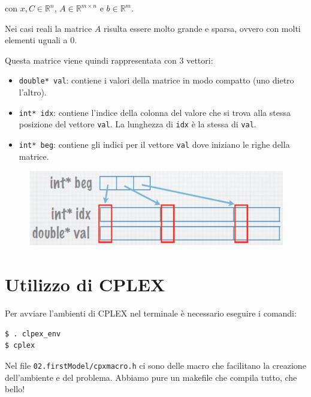 \noindent con $x,C \in \mathbb{R}^n$, $A \in \mathbb{R}^{m \times n}$ e $b \in \mathbb{R}^m$.

Nei casi reali la matrice $A$ risulta essere molto grande e sparsa, ovvero con molti elementi uguali a 0.

Questa matrice viene quindi rappresentata con 3 vettori:

\begin{itemize}
	\item \texttt{double* val}: contiene i valori della matrice in modo compatto (uno dietro l'altro).
	\item \texttt{int* idx}: contiene l'indice della colonna del valore che si trova alla stessa posizione del vettore \texttt{val}. La lunghezza di \texttt{idx} è la stessa di \texttt{val}.
	\item \texttt{int* beg}: contiene gli indici per il vettore \texttt{val} dove iniziano le righe della matrice.
\end{itemize}

\begin{figure}[htbp]
	\centering
	\includegraphics[width=0.5\linewidth]{./images/lab1-matrix}
\end{figure}

\section{Utilizzo di CPLEX}

Per avviare l'ambienti di CPLEX nel terminale è necessario eseguire i comandi:

\begin{verbatim}
$ . clpex_env
$ cplex
\end{verbatim}

\noindent Nel file \texttt{02.firstModel/cpxmacro.h} ci sono delle macro che facilitano la creazione dell'ambiente e del problema.
Abbiamo pure un makefile che compila tutto, che bello!